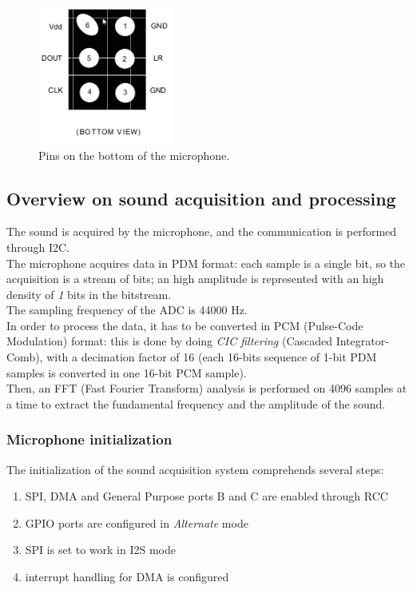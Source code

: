 \begin{figure}[H]
	\hspace*{0.3 \textwidth}\includegraphics[width= 0.4\textwidth]
	{files/images/mic_bottom_pins}
	\caption{Pins on the bottom of the microphone.}
\end{figure}

\subsection{Overview on sound acquisition and processing}
The sound is acquired by the microphone, and the communication is performed through I2C.\\
The microphone acquires data in PDM format: each sample is a single bit, so the acquisition is a stream of bits; an high amplitude is represented with an high density of \textit{1} bits in the bitstream. \\
The sampling frequency of the ADC is 44000 Hz. \\
In order to process the data, it has to be converted in PCM (Pulse-Code Modulation) format: this is done by doing \textit{CIC filtering} (Cascaded Integrator-Comb), with a decimation factor of 16 (each 16-bits sequence of 1-bit PDM samples is converted in one 16-bit PCM sample).\\
Then, an FFT (Fast Fourier Transform) analysis is performed on 4096 samples at a time to extract the fundamental frequency and the amplitude of the sound.

\subsubsection{Microphone initialization}
The initialization of the sound acquisition system comprehends several steps:
\begin{enumerate}
	\item SPI, DMA and General Purpose ports B and C are enabled through RCC
	\item GPIO ports are configured in \textit{Alternate} mode
	\item SPI is set to work in I2S mode
	\item interrupt handling for DMA is configured
	
\end{enumerate}

